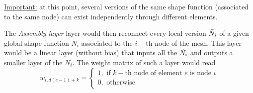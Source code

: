 \documentclass{article}
\begin{document}
\underline{Important:} at this point, several versions of the same shape function (associated to the same node) can exist independently through different elements.

The \emph{Assembly layer} layer would then reconnect every local version $\Tilde{N}_i$ of a given global shape function $N_i$ associated to the $i-\text{th}$ node of the mesh. This layer would be a linear layer (without bias) that inputs all the $\Tilde{N}_i$ and outputs a smaller layer of the $N_i$.
The weight matrix of such a layer would read
\begin{equation}
    w_{i,d\left(e-1\right)+k} = \begin{cases}
        1,\text{ if }k-\text{th node of element }e\text{ is node }i \\
        0,\text{ otherwise}
    \end{cases}
\end{equation}


	\printbibliography[heading=bibintoc]
\end{document}
